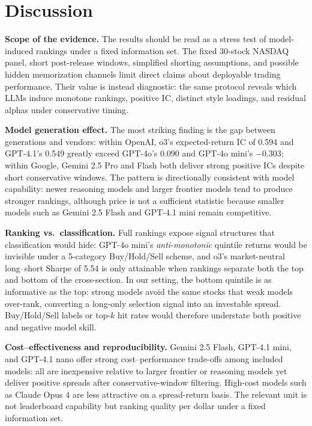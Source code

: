 \section{Discussion}
\label{sec:limitations}

\textbf{Scope of the evidence.}
The results should be read as a stress test of model-induced rankings under a fixed information set.
The fixed 30-stock NASDAQ panel, short post-release windows, simplified shorting assumptions, and possible hidden memorization channels limit direct claims about deployable trading performance.
Their value is instead diagnostic: the same protocol reveals which LLMs induce monotone rankings, positive IC, distinct style loadings, and residual alphas under conservative timing.

\textbf{Model generation effect.}
The most striking finding is the gap between generations and vendors: within OpenAI, o3's expected-return IC of 0.594 and GPT-4.1's 0.549 greatly exceed GPT-4o's 0.090 and GPT-4o mini's $-0.303$; within Google, Gemini 2.5 Pro and Flash both deliver strong positive ICs despite short conservative windows.
The pattern is directionally consistent with model capability: newer reasoning models and larger frontier models tend to produce stronger rankings, although price is not a sufficient statistic because smaller models such as Gemini 2.5 Flash and GPT-4.1 mini remain competitive.

\textbf{Ranking vs.\ classification.}
Full rankings expose signal structures that classification would hide: GPT-4o mini's \emph{anti-monotonic} quintile returns would be invisible under a 5-category Buy/Hold/Sell scheme, and o3's market-neutral long--short Sharpe of 5.54 is only attainable when rankings separate both the top and bottom of the cross-section.
In our setting, the bottom quintile is as informative as the top: strong models avoid the same stocks that weak models over-rank, converting a long-only selection signal into an investable spread.
Buy/Hold/Sell labels or top-$k$ hit rates would therefore understate both positive and negative model skill.

\textbf{Cost--effectiveness and reproducibility.}
Gemini 2.5 Flash, GPT-4.1 mini, and GPT-4.1 nano offer strong cost--performance trade-offs among included models: all are inexpensive relative to larger frontier or reasoning models yet deliver positive spreads after conservative-window filtering.
High-cost models such as Claude Opus 4 are less attractive on a spread-return basis.
The relevant unit is not leaderboard capability but ranking quality per dollar under a fixed information set.

